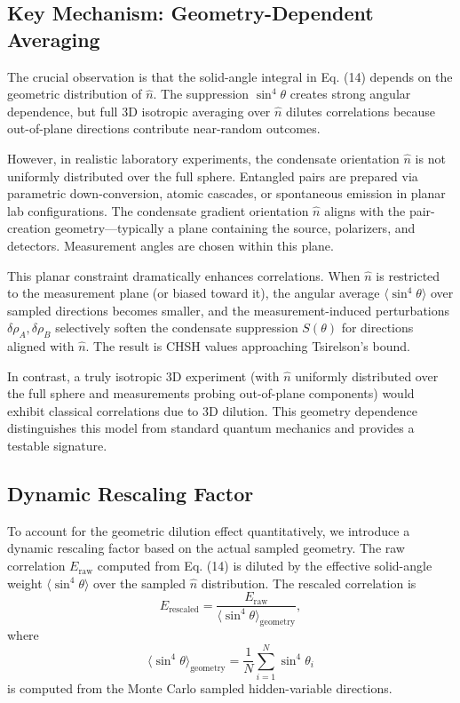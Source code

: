 \documentclass[11pt,a4paper]{article}
\theoremstyle{definition}
\theoremstyle{remark}
\begin{document}
\subsection{Key Mechanism: Geometry-Dependent Averaging}

The crucial observation is that the solid-angle integral in Eq. (14) depends on the geometric distribution of $\hat{n}$. The suppression $\sin^4\theta$ creates strong angular dependence, but full 3D isotropic averaging over $\hat{n}$ dilutes correlations because out-of-plane directions contribute near-random outcomes.

However, in realistic laboratory experiments, the condensate orientation $\hat{n}$ is not uniformly distributed over the full sphere. Entangled pairs are prepared via parametric down-conversion, atomic cascades, or spontaneous emission in planar lab configurations. The condensate gradient orientation $\hat{n}$ aligns with the pair-creation geometry---typically a plane containing the source, polarizers, and detectors. Measurement angles are chosen within this plane.

This planar constraint dramatically enhances correlations. When $\hat{n}$ is restricted to the measurement plane (or biased toward it), the angular average $\langle \sin^4\theta \rangle$ over sampled directions becomes smaller, and the measurement-induced perturbations $\delta\rho_A, \delta\rho_B$ selectively soften the condensate suppression $S(\theta)$ for directions aligned with $\hat{n}$. The result is CHSH values approaching Tsirelson's bound.

In contrast, a truly isotropic 3D experiment (with $\hat{n}$ uniformly distributed over the full sphere and measurements probing out-of-plane components) would exhibit classical correlations due to 3D dilution. This geometry dependence distinguishes this model from standard quantum mechanics and provides a testable signature.

\subsection{Dynamic Rescaling Factor}

To account for the geometric dilution effect quantitatively, we introduce a dynamic rescaling factor based on the actual sampled geometry. The raw correlation $E_{\mathrm{raw}}$ computed from Eq. (14) is diluted by the effective solid-angle weight $\langle \sin^4\theta \rangle$ over the sampled $\hat{n}$ distribution. The rescaled correlation is
\begin{equation}
E_{\mathrm{rescaled}} = \frac{E_{\mathrm{raw}}}{\langle \sin^4\theta \rangle_{\mathrm{geometry}}},
\label{P8:eq:E_rescaled}
\end{equation}
where
\begin{equation}
\langle \sin^4\theta \rangle_{\mathrm{geometry}} = \frac{1}{N} \sum_{i=1}^N \sin^4\theta_i
\label{P8:eq:sin4_geometry_avg}
\end{equation}
is computed from the Monte Carlo sampled hidden-variable directions.
\end{document}
